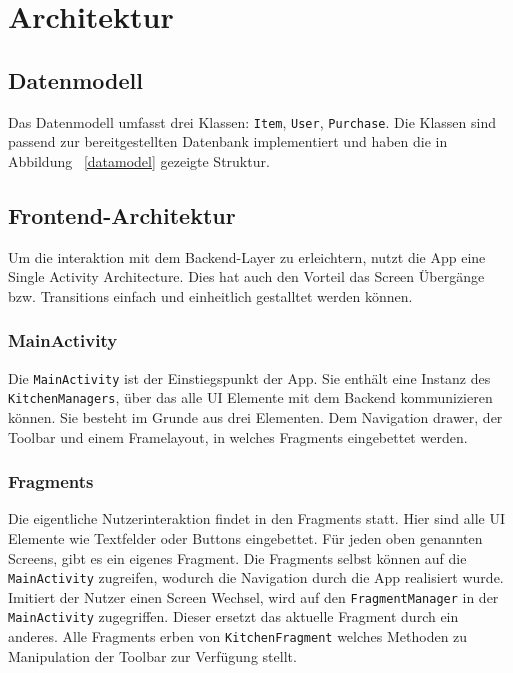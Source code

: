 \section{Architektur}\label{sec:architecture}

\subsection{Datenmodell}\label{subsec:datamodel}

Das Datenmodell umfasst drei Klassen: \texttt{Item}, \texttt{User}, \texttt{Purchase}.
Die Klassen sind passend zur bereitgestellten Datenbank implementiert und haben die in Abbildung ~\ref{datamodel} gezeigte Struktur.


\subsection{Frontend-Architektur}\label{subsec:frontend}
Um die interaktion mit dem Backend-Layer zu erleichtern, nutzt die 
App eine Single Activity Architecture.
Dies hat auch den Vorteil das
Screen Übergänge bzw. Transitions einfach und 
einheitlich gestalltet werden können.

\subsubsection{MainActivity}
Die \texttt{MainActivity} ist der Einstiegspunkt der App.
Sie enthält eine Instanz des \texttt{KitchenManagers}, 
über das alle UI Elemente mit dem Backend kommunizieren können. Sie besteht im Grunde aus drei Elementen. Dem Navigation drawer, der Toolbar und einem Framelayout, in welches Fragments eingebettet werden.

\subsubsection{Fragments}
Die eigentliche Nutzerinteraktion findet in den Fragments statt. 
Hier sind alle UI Elemente wie Textfelder oder Buttons eingebettet. 
Für jeden oben genannten Screens, gibt es ein eigenes Fragment.
Die Fragments selbst können auf die \texttt{MainActivity} zugreifen, wodurch 
die Navigation durch die App realisiert wurde. 
Imitiert der Nutzer einen Screen Wechsel, wird auf den \texttt{FragmentManager} in der  \texttt{MainActivity} zugegriffen. Dieser ersetzt das aktuelle Fragment durch ein anderes.
Alle Fragments erben von \texttt{KitchenFragment} welches Methoden zu Manipulation der Toolbar zur Verfügung stellt.
  

